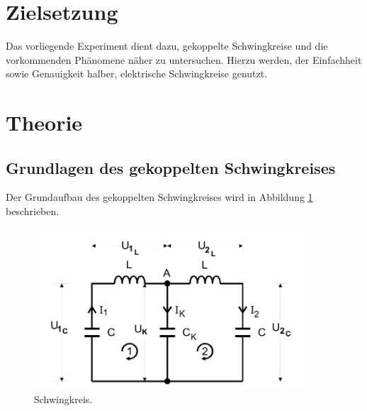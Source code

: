 \section{Zielsetzung}
Das vorliegende Experiment dient dazu, gekoppelte Schwingkreise und die vorkommenden Phänomene näher zu untersuchen.
Hierzu werden, der Einfachheit sowie Genauigkeit halber, elektrische Schwingkreise genutzt.


\section{Theorie}
\subsection{Grundlagen des gekoppelten Schwingkreises}
\label{sec:Theorie}
Der Grundaufbau des gekoppelten Schwingkreises wird in Abbildung \ref{fig:schwingkreis} beschrieben.

\begin{figure}[H]
  \centering
  \includegraphics[height=6cm]{kreis.png}
  \caption{Schwingkreis. \cite{sample}}
  \label{fig:schwingkreis}
\end{figure}

